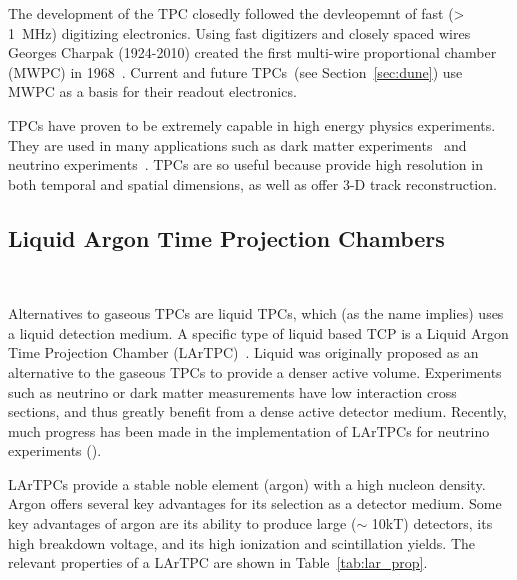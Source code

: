 The development of the TPC closedly followed the devleopemnt of fast (> 1~\unit{MHz}) digitizing electronics.
Using fast digitizers and closely spaced wires Georges Charpak (1924-2010) created the first multi-wire proportional chamber (MWPC) in 1968~\citep{Charpak:1968kd}.
Current and future TPCs~(see Section~\ref{sec:dune}) use MWPC as a basis for their readout electronics.

TPCs have proven to be extremely capable in high energy physics experiments.
They are used in many applications such as dark matter experiments~\citep{Aprile_2017_xenon1T} and neutrino experiments~\citep{MicroBooNE_Acciarri_2017}.
TPCs are so useful because provide high resolution in both temporal and spatial dimensions, as well as offer 3-D track reconstruction.


\subsection{Liquid Argon Time Projection Chambers}~\label{sec:lartpcs}

Alternatives to gaseous TPCs are liquid TPCs, which (as the name implies) uses a liquid detection medium.
A specific type of liquid based TCP is a Liquid Argon Time Projection Chamber (LArTPC)~\citep{rubbia1977liquid}.
Liquid was originally proposed as an alternative to the gaseous TPCs to provide a denser active volume.
Experiments such as neutrino or dark matter measurements have low interaction cross sections, and thus greatly benefit from a dense active detector medium.
Recently, much progress has been made in the implementation of LArTPCs for neutrino experiments (\citep{ArgoNeuT_PhysRevD.99.012002, MicroBooNE_Acciarri_2017, LArIAT_Acciarri_2020}).

LArTPCs provide a stable noble element (argon) with a high nucleon density.
Argon offers several key advantages for its selection as a detector medium.
Some key advantages of argon are its ability to produce large ($\sim$ 10kT) detectors, its high breakdown voltage, and its high ionization and scintillation yields.
The relevant properties of a LArTPC are shown in Table~\ref{tab:lar_prop}.

